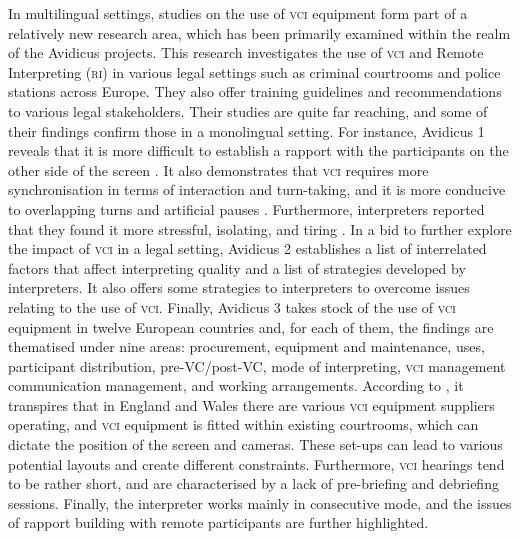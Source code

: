 \documentclass[output=paper]{langsci/langscibook}
\begin{document}
In multilingual settings, studies on the use of \textsc{vci} equipment form part of a relatively new research area, which has been primarily examined within the realm of the Avidicus projects. This research investigates the use of \textsc{vci} and Remote Interpreting (\textsc{ri}) in various legal settings such as criminal courtrooms and police stations across Europe. They also offer training guidelines and recommendations to various legal stakeholders. Their studies are quite far reaching, and some of their findings confirm those in a monolingual setting. For instance, Avidicus 1 reveals that it is more difficult to establish a rapport with the participants on the other side of the screen \citep{Rombouts2011}. It also demonstrates that \textsc{vci} requires more synchronisation in terms of interaction and turn-taking, and it is more conducive to overlapping turns and artificial pauses \citep{Balogh2011}. Furthermore, interpreters reported that they found it more stressful, isolating, and tiring \citep{Miler-Cassino2011}. In a bid to further explore the impact of \textsc{vci} in a legal setting, Avidicus 2 establishes a list of interrelated factors that affect interpreting quality and a list of strategies developed by interpreters. It also offers some strategies to interpreters to overcome issues relating to the use of \textsc{vci}. Finally, Avidicus 3 takes stock of the use of \textsc{vci} equipment in twelve European countries and, for each of them, the findings are thematised under nine areas: procurement, equipment and maintenance, uses, participant distribution, pre-VC/post-VC, mode of interpreting, \textsc{vci} management communication management, and working arrangements. According to \citet{Braun2016a}, it transpires that in England and Wales there are various \textsc{vci} equipment suppliers operating, and \textsc{vci} equipment is fitted within existing courtrooms, which can dictate the position of the screen and cameras. These set-ups can lead to various potential layouts and create different constraints. Furthermore, \textsc{vci} hearings tend to be rather short, and are characterised by a lack of pre-briefing and debriefing sessions. Finally, the interpreter works mainly in consecutive mode, and the issues of rapport building with remote participants are further highlighted. 
\end{document}
